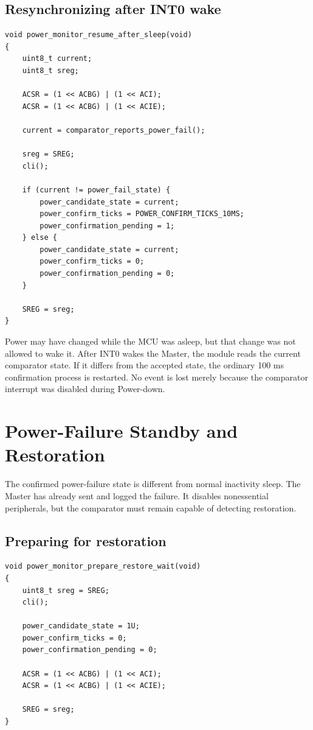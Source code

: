 \documentclass[11pt,a4paper]{article}
\begin{document}
\subsection{Resynchronizing after INT0 wake}

\begin{lstlisting}[style=cstyle]
void power_monitor_resume_after_sleep(void)
{
    uint8_t current;
    uint8_t sreg;

    ACSR = (1 << ACBG) | (1 << ACI);
    ACSR = (1 << ACBG) | (1 << ACIE);

    current = comparator_reports_power_fail();

    sreg = SREG;
    cli();

    if (current != power_fail_state) {
        power_candidate_state = current;
        power_confirm_ticks = POWER_CONFIRM_TICKS_10MS;
        power_confirmation_pending = 1;
    } else {
        power_candidate_state = current;
        power_confirm_ticks = 0;
        power_confirmation_pending = 0;
    }

    SREG = sreg;
}
\end{lstlisting}

Power may have changed while the MCU was asleep, but that change was not allowed to wake it. After INT0 wakes the Master, the module reads the current comparator state. If it differs from the accepted state, the ordinary 100 ms confirmation process is restarted. No event is lost merely because the comparator interrupt was disabled during Power-down.

\section{Power-Failure Standby and Restoration}
The confirmed power-failure state is different from normal inactivity sleep. The Master has already sent and logged the failure. It disables nonessential peripherals, but the comparator must remain capable of detecting restoration.

\subsection{Preparing for restoration}

\begin{lstlisting}[style=cstyle]
void power_monitor_prepare_restore_wait(void)
{
    uint8_t sreg = SREG;
    cli();

    power_candidate_state = 1U;
    power_confirm_ticks = 0;
    power_confirmation_pending = 0;

    ACSR = (1 << ACBG) | (1 << ACI);
    ACSR = (1 << ACBG) | (1 << ACIE);

    SREG = sreg;
}
\end{lstlisting}
\end{document}

